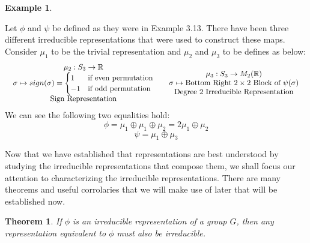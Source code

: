 \documentclass[10pt]{ucthesis}
\newtheorem{theorem}[definition]{Theorem}
\newtheorem{example}[definition]{Example}
\begin{document}
\begin{example}\end{example}
	Let $\phi$ and $\psi$ be defined as they were in Example 3.13. There have been three different irreducible representations that were used to construct these maps. Consider $\mu_1$ to be the trivial representation and $\mu_2$ and $\mu_3$ to be defines as below:
$$\begin{array}{c c}
	\begin{array}{c}
		\mu_2 : S_3 \rightarrow \mathbb{R} \\
		\sigma \mapsto sign(\sigma) = \begin{cases}
										1 & \text{if even permutation} \\
										-1 & \text{if odd permutation}
									   \end{cases}\\
		\text{Sign Representation}
	\end{array}
&
	\begin{array}{c}
		\mu_3 : S_3 \rightarrow M_2(\mathbb{R}) \\
		\sigma \mapsto \text{Bottom Right } 2\times2 \text{ Block of } \psi(\sigma)\\
		\text{Degree 2 Irreducible Representation}
	\end{array}
\end{array}$$
We can see the following two equalities hold:
$$\phi = \mu_1 \oplus \mu_1 \oplus \mu_2 = 2\mu_1 \oplus \mu_2$$
$$\psi = \mu_1 \oplus \mu_3$$

Now that we have established that representations are best understood by studying the irreducible representations that compose them, we shall focus our attention to characterizing the irreducible representations. There are many theorems and useful corrolaries that we will make use of later that will be established now.

\begin{theorem}
	If $\phi$ is an irreducible representation of a group $G$, then any representation equivalent to $\phi$ must also be irreducible.
\end{theorem}
\end{document}
